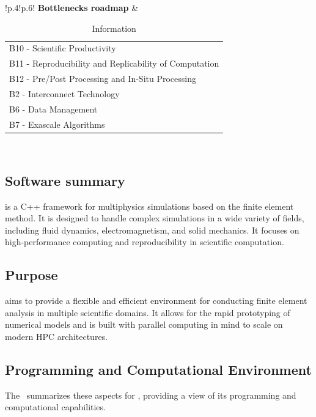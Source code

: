 \begin{table}[!ht]
{{\begin{tabular}{!{\color{numpexgray}\vrule}p{.4\textwidth}!{\color{numpexgray}\vrule}p{.6\textwidth}!{\color{numpexgray}\vrule}}
        \textbf{Bottlenecks roadmap} & \begin{tabular}{l}
B10 - Scientific Productivity\\
B11 - Reproducibility and Replicability of Computation\\
B12 - Pre/Post Processing and In-Situ Processing\\
B2 - Interconnect Technology\\
B6 - Data Management\\
B7 - Exascale Algorithms\\
\end{tabular} \\
        \bottomrule
    \end{tabular}
    }}
    \caption{\Feelpp Information}
\end{table}

\subsection{Software summary}
\label{sec:Feelpp:summary}
\Feelpp is a C++ framework for multiphysics simulations based on the finite element method.
It is designed to handle complex simulations in a wide variety of fields, including fluid dynamics, electromagnetism, and solid mechanics.
It focuses on high-performance computing and reproducibility in scientific computation.

\subsection{Purpose}
\label{sec:Feelpp:purpose}
\Feelpp aims to provide a flexible and efficient environment for conducting finite element analysis in multiple scientific domains.
It allows for the rapid prototyping of numerical models and is built with parallel computing in mind to scale on modern HPC architectures.

\subsection{Programming and Computational Environment}
\label{sec::Feelpp:environment_capabilities}

The~ summarizes these aspects for \Feelpp, providing a view of its programming and computational capabilities.

